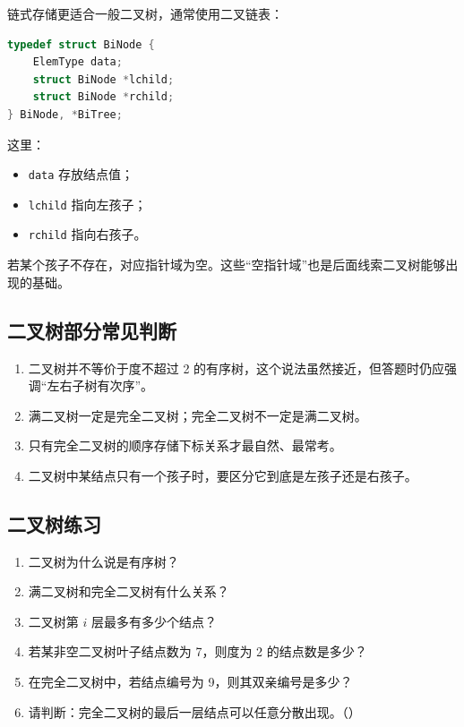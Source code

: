 \documentclass{../../note}
\begin{document}
链式存储更适合一般二叉树，通常使用二叉链表：

\begin{lstlisting}[language=C]
typedef struct BiNode {
    ElemType data;
    struct BiNode *lchild;
    struct BiNode *rchild;
} BiNode, *BiTree;
\end{lstlisting}

这里：

\begin{itemize}
  \item \texttt{data} 存放结点值；
  \item \texttt{lchild} 指向左孩子；
  \item \texttt{rchild} 指向右孩子。
\end{itemize}

若某个孩子不存在，对应指针域为空。这些“空指针域”也是后面线索二叉树能够出现的基础。

\subsection{二叉树部分常见判断}

\begin{enumerate}
  \item 二叉树并不等价于度不超过 2 的有序树，这个说法虽然接近，但答题时仍应强调“左右子树有次序”。
  \item 满二叉树一定是完全二叉树；完全二叉树不一定是满二叉树。
  \item 只有完全二叉树的顺序存储下标关系才最自然、最常考。
  \item 二叉树中某结点只有一个孩子时，要区分它到底是左孩子还是右孩子。
\end{enumerate}

\subsection{二叉树练习}

\begin{enumerate}
  \item 二叉树为什么说是有序树？
  \item 满二叉树和完全二叉树有什么关系？
  \item 二叉树第 $i$ 层最多有多少个结点？
  \item 若某非空二叉树叶子结点数为 7，则度为 2 的结点数是多少？
  \item 在完全二叉树中，若结点编号为 9，则其双亲编号是多少？
  \item 请判断：完全二叉树的最后一层结点可以任意分散出现。（\hspace{1cm}）
\end{enumerate}
\end{document}
